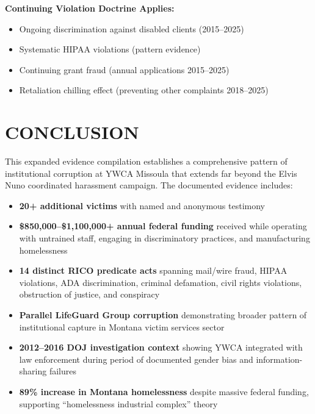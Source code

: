 \documentclass[11pt,letterpaper]{article}
\renewcommand{\checkmark}{\ding{51}}
\begin{document}
\textbf{Continuing Violation Doctrine Applies:}
\begin{itemize}[leftmargin=*]
\item Ongoing discrimination against disabled clients (2015--2025)
\item Systematic HIPAA violations (pattern evidence)
\item Continuing grant fraud (annual applications 2015--2025)
\item Retaliation chilling effect (preventing other complaints 2018--2025)
\end{itemize}

\newpage

\section{CONCLUSION}

This expanded evidence compilation establishes a comprehensive pattern of institutional corruption at YWCA Missoula that extends far beyond the Elvis Nuno coordinated harassment campaign. The documented evidence includes:

\begin{itemize}[leftmargin=*]
\item[\checkmark] \textbf{20+ additional victims} with named and anonymous testimony
\item[\checkmark] \textbf{\$850,000--\$1,100,000+ annual federal funding} received while operating with untrained staff, engaging in discriminatory practices, and manufacturing homelessness
\item[\checkmark] \textbf{14 distinct RICO predicate acts} spanning mail/wire fraud, HIPAA violations, ADA discrimination, criminal defamation, civil rights violations, obstruction of justice, and conspiracy
\item[\checkmark] \textbf{Parallel LifeGuard Group corruption} demonstrating broader pattern of institutional capture in Montana victim services sector
\item[\checkmark] \textbf{2012--2016 DOJ investigation context} showing YWCA integrated with law enforcement during period of documented gender bias and information-sharing failures
\item[\checkmark] \textbf{89\% increase in Montana homelessness} despite massive federal funding, supporting ``homelessness industrial complex'' theory
\end{itemize}

\vspace{0.2in}
\end{document}
